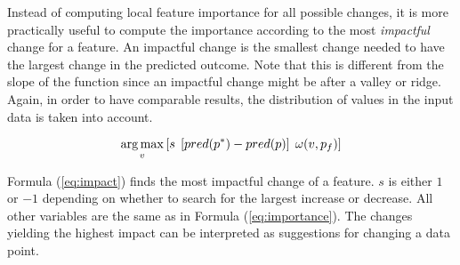 Instead of computing local feature importance for all possible changes, it is more
practically useful to compute the importance according to the most \emph{impactful} change for a feature.
An impactful change is the smallest change needed to have the largest change in the predicted outcome.
Note that this is different from the slope of the function since an impactful change
might be after a valley or ridge. Again, in order to have comparable
results, the distribution of values in the input data is taken into account.

\begin{equation}
\operatorname*{arg\,max}_v \left[
s \; \left[ pred(p^{\ast}) - pred(p) \right] \; \omega(v, p_f)
\right]
\label{eq:impact}
\end{equation}

Formula (\ref{eq:impact}) finds the most impactful change of a feature.
$s$ is either $1$ or $-1$ depending on whether to search for the largest increase or decrease.
All other variables are the same as in Formula (\ref{eq:importance}).
The changes yielding the highest impact can be interpreted as suggestions for changing a data point.


